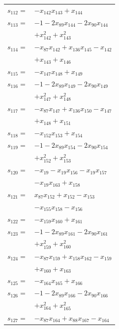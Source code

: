 \begin{longtable}{@{}r@{\;}l@{}}
\(s_{112}=\) & \(\displaystyle -x_{142}x_{143} +x_{144}\) \\[3pt]
\(s_{113}=\) & \(\displaystyle -1 -2x_{89}x_{144} -2x_{90}x_{144}\) \\
 & \(\displaystyle +x_{142}^{2} +x_{143}^{2}\) \\[3pt]
\(s_{114}=\) & \(\displaystyle -x_{87}x_{142} +x_{136}x_{145} -x_{142}\) \\
 & \(\displaystyle +x_{143} +x_{146}\) \\[3pt]
\(s_{115}=\) & \(\displaystyle -x_{147}x_{148} +x_{149}\) \\[3pt]
\(s_{116}=\) & \(\displaystyle -1 -2x_{89}x_{149} -2x_{90}x_{149}\) \\
 & \(\displaystyle +x_{147}^{2} +x_{148}^{2}\) \\[3pt]
\(s_{117}=\) & \(\displaystyle -x_{87}x_{147} +x_{136}x_{150} -x_{147}\) \\
 & \(\displaystyle +x_{148} +x_{151}\) \\[3pt]
\(s_{118}=\) & \(\displaystyle -x_{152}x_{153} +x_{154}\) \\[3pt]
\(s_{119}=\) & \(\displaystyle -1 -2x_{89}x_{154} -2x_{90}x_{154}\) \\
 & \(\displaystyle +x_{152}^{2} +x_{153}^{2}\) \\[3pt]
\(s_{120}=\) & \(\displaystyle -x_{19} -x_{19}x_{156} -x_{19}x_{157}\) \\
 & \(\displaystyle -x_{19}x_{163} +x_{158}\) \\[3pt]
\(s_{121}=\) & \(\displaystyle x_{87}x_{152} +x_{152} -x_{153}\) \\
 & \(\displaystyle -x_{155}x_{158} -x_{156}\) \\[3pt]
\(s_{122}=\) & \(\displaystyle -x_{159}x_{160} +x_{161}\) \\[3pt]
\(s_{123}=\) & \(\displaystyle -1 -2x_{89}x_{161} -2x_{90}x_{161}\) \\
 & \(\displaystyle +x_{159}^{2} +x_{160}^{2}\) \\[3pt]
\(s_{124}=\) & \(\displaystyle -x_{87}x_{159} +x_{158}x_{162} -x_{159}\) \\
 & \(\displaystyle +x_{160} +x_{163}\) \\[3pt]
\(s_{125}=\) & \(\displaystyle -x_{164}x_{165} +x_{166}\) \\[3pt]
\(s_{126}=\) & \(\displaystyle -1 -2x_{89}x_{166} -2x_{90}x_{166}\) \\
 & \(\displaystyle +x_{164}^{2} +x_{165}^{2}\) \\[3pt]
\(s_{127}=\) & \(\displaystyle -x_{87}x_{164} +x_{88}x_{167} -x_{164}\) \\

\end{longtable}
